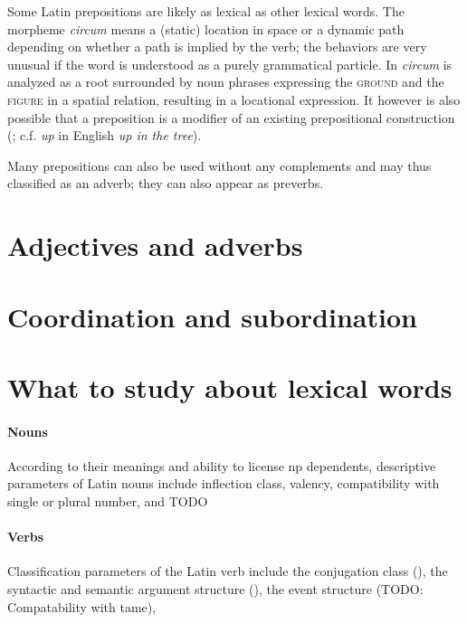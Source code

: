 \documentclass[a4paper, oneside, 12pt]{report}
\newcommand{\form}[1]{\emph{#1}}
\newcommand*{\category}[1]{\textsc{#1}}
\begin{document}
Some Latin prepositions are likely as lexical as other lexical words.
The morpheme \form{circum} means a (static) location in space or a dynamic path 
depending on whether a path is implied by the verb;
the behaviors are very unusual if the word is understood as a purely grammatical particle.
In \citet{mare2018issues} \form{circum} is analyzed as
a root surrounded by noun phrases expressing the \category{ground} and the \category{figure} 
in a spatial relation,
resulting in a locational expression.
It however is also possible that a preposition is a modifier of an existing prepositional construction
(\citealt{botwinik2008greek}; c.f. \form{up} in English \form{up in the tree}).

Many prepositions can also be used without any complements 
and may thus classified as an adverb; 
they can also appear as preverbs.


\section{Adjectives and adverbs}


\section{Coordination and subordination}

\section{What to study about lexical words}

\paragraph*{Nouns}

According to their meanings and ability to license \acs{np} dependents, 
descriptive parameters of Latin nouns include 
inflection class, valency, compatibility with single or plural number, and TODO

\paragraph*{Verbs}

Classification parameters of the Latin verb include 
the conjugation class (),
the syntactic and semantic argument structure
(), 
the event structure (TODO: Compatability with \acs{tame}),
\end{document}
